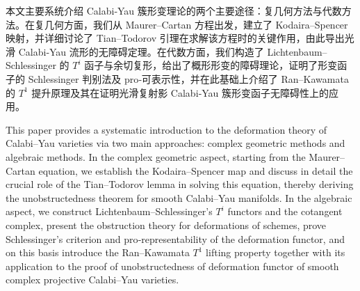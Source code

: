 
\begin{cabstract}
本文主要系统介绍 Calabi‑Yau 簇形变理论的两个主要途径：复几何方法与代数方法。在复几何方面，我们从 Maurer–Cartan 方程出发，建立了 Kodaira–Spencer 映射，并详细讨论了 Tian–Todorov 引理在求解该方程时的关键作用，由此导出光滑 Calabi‑Yau 流形的无障碍定理。在代数方面，我们构造了 Lichtenbaum–Schlessinger 的 \(T^i\) 函子与余切复形，给出了概形形变的障碍理论，证明了形变函子的 Schlessinger 判别法及 pro‑可表示性，并在此基础上介绍了 Ran–Kawamata 的 \(T^1\) 提升原理及其在证明光滑复射影 Calabi‑Yau 簇形变函子无障碍性上的应用。
\end{cabstract}

\begin{eabstract}
This paper provides a systematic introduction to the deformation theory of Calabi--Yau varieties via two main approaches: complex geometric methods and algebraic methods. 
In the complex geometric aspect, starting from the Maurer--Cartan equation, we establish the Kodaira--Spencer map and discuss in detail the crucial role of the Tian--Todorov lemma in solving this equation, thereby deriving the unobstructedness theorem for smooth Calabi--Yau manifolds. 
In the algebraic aspect, we construct Lichtenbaum--Schlessinger's \(T^i\) functors and the cotangent complex, present the obstruction theory for deformations of schemes, prove Schlessinger's criterion and pro‑representability of the deformation functor, and on this basis introduce the Ran--Kawamata \(T^1\) lifting property together with its application to the proof of unobstructedness of deformation functor of smooth complex projective Calabi--Yau varieties.
\end{eabstract}